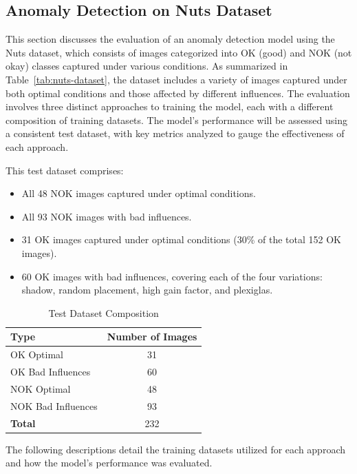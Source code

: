\documentclass[12pt,DIV14,BCOR12mm,a4paper,footinclude=false,headinclude,parskip=half-,twoside,openright,cleardoublepage=empty,toc=index,bibliography=totoc,listof=totoc]{scrreprt}
\numberwithin{equation}{chapter}
\begin{document}
\subsection{Anomaly Detection on Nuts Dataset}
This section discusses the evaluation of an anomaly detection model using the Nuts dataset, which consists of images categorized into OK (good) and NOK (not okay) classes captured under various conditions. As summarized in Table~\ref{tab:nuts-dataset}, the dataset includes a variety of images captured under both optimal conditions and those affected by different influences. The evaluation involves three distinct approaches to training the model, each with a different composition of training datasets. The model's performance will be assessed using a consistent test dataset, with key metrics analyzed to gauge the effectiveness of each approach.

This test dataset comprises:

\begin{itemize}
    \item All 48 NOK images captured under optimal conditions.
    \item All 93 NOK images with bad influences.
    \item 31 OK images captured under optimal conditions (30\% of the total 152 OK images).
    \item 60 OK images with bad influences, covering each of the four variations: shadow, random placement, high gain factor, and plexiglas.
\end{itemize}

\begin{table} 
    \centering
    \caption{Test Dataset Composition}
    \label{tab:test-dataset-composition}
    \begin{tabular}{lc} %
        \toprule
        \textbf{Type} & \textbf{Number of Images} \\ 
        \midrule
        OK Optimal & 31 \\ 
        OK Bad Influences & 60 \\ 
        NOK Optimal & 48 \\ 
        NOK Bad Influences & 93 \\ 
        \midrule
        \textbf{Total} & 232 \\ 
        \bottomrule
    \end{tabular}
\end{table}

The following descriptions detail the training datasets utilized for each approach and how the model's performance was evaluated.
\end{document}

